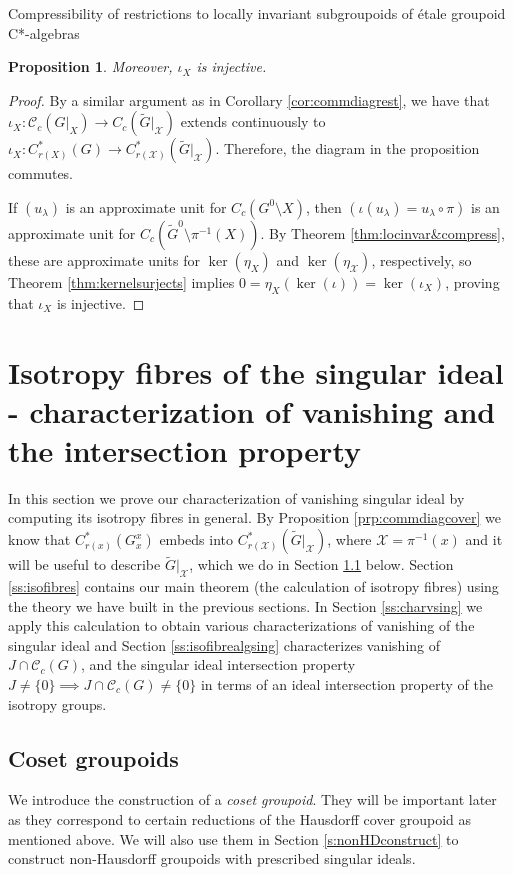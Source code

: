 \documentclass[a4paper, 12pt]{amsart}
\newtheorem{prp}[thm]{Proposition}
\theoremstyle{definition}
\theoremstyle{remark}
\numberwithin{equation}{section}
\begin{document}
\begin{section}{Compressibility of restrictions to locally invariant subgroupoids of \'etale groupoid C*-algebras}
\begin{prp}
Moreover, $\iota_{X}$ is injective.
    
\end{prp}

\begin{proof}

By a similar argument as in Corollary \ref{cor:commdiagrest}, we have that $\iota_{X}:\mathscr{C}_{c}(G|_{X})\to C_{c}(\tilde{G}|_{\mathcal{X}})$ extends continuously to $\iota_{X}:C^{*}_{r(X)}(G)\to C^{*}_{r(\mathcal{X})}(\tilde{G}|_{\mathcal{X}})$. Therefore, the diagram in the proposition commutes.

If $(u_{\lambda})$ is an approximate unit for $C_{c}(G^{0}\setminus X)$, then $(\iota(u_{\lambda}) = u_{\lambda}\circ \pi)$ is an approximate unit for $C_{c}(\tilde{G}^{0}\setminus \pi^{-1}(X))$. By Theorem \ref{thm:locinvar&compress}, these are approximate units for $\ker(\eta_{X})$ and $
\ker(\eta_{\mathcal{X}})$, respectively, so Theorem \ref{thm:kernelsurjects} implies $ 0 = \eta_{X}(\ker(\iota)) = \ker(\iota_{X})$, proving that $\iota_{X}$ is injective.


\end{proof}


\end{section}


\section{Isotropy fibres of the singular ideal - characterization of vanishing and the intersection property}
\label{s:isofibre}
In this section we prove our characterization of vanishing singular ideal by computing its isotropy fibres in general. By Proposition \ref{prp:commdiagcover} we know that $C^{*}_{r(x)}(G^{x}_{x})$ embeds into $C^{*}_{r(\mathcal{X})}(\tilde{G}|_{\mathcal{X}})$, where $\mathcal{X} = \pi^{-1}(x)$ and it will be useful to describe $\tilde{G}|_{\mathcal{X}}$, which we do in Section \ref{ss:cosetgpds} below. Section \ref{ss:isofibres} contains our main theorem (the calculation of isotropy fibres) using the theory we have built in the previous sections. In Section \ref{ss:charvsing} we apply this calculation to obtain various characterizations of vanishing of the singular ideal and Section \ref{ss:isofibrealgsing} characterizes vanishing of $J\cap\mathscr{C}_{c}(G)$, and the singular ideal intersection property $J\neq\{0\}\implies J\cap\mathscr{C}_{c}(G)\neq \{0\}$ in terms of an ideal intersection property of the isotropy groups.
\subsection{Coset groupoids}
\label{ss:cosetgpds}
We introduce the construction of a \emph{coset groupoid}. They will be important later as they correspond to certain reductions of the Hausdorff cover groupoid as mentioned above. We will also use them in Section \ref{s:nonHDconstruct} to construct non-Hausdorff groupoids with prescribed singular ideals.
\end{document}
